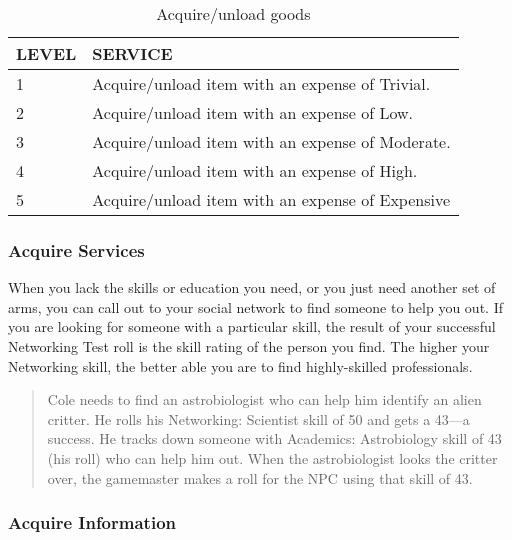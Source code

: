 \begin{table} \caption{Acquire/unload goods} \begin{tabular}{|l|l|} \hline

LEVEL &SERVICE \\ \hline

1 &Acquire/unload item with an expense of Trivial. \\ \hline

2 &Acquire/unload item with an expense of Low. \\ \hline

3 &Acquire/unload item with an expense of Moderate. \\ \hline

4 &Acquire/unload item with an expense of High. \\ \hline

5 &Acquire/unload item with an expense of Expensive \\ \hline

\end{tabular} \end{table} 



\subsubsection{Acquire Services} 

When you lack the skills or education you need, or you just need another set of arms, you can call out to your social network to find someone to help you out. If you are looking for someone with a particular skill, the result of your successful Networking Test roll is the skill rating of the person you find. The higher your Networking skill, the better able you are to find highly-skilled professionals. 

\begin{quotation} Cole needs to find an astrobiologist who can help him identify an alien critter. He rolls his Networking: Scientist skill of 50 and gets a 43—a success. He tracks down someone with Academics: Astrobiology skill of 43 (his roll) who can help him out. When the astrobiologist looks the critter over, the gamemaster makes a roll for the NPC using that skill of 43. \end{quotation} 



\subsubsection{Acquire Information} 

